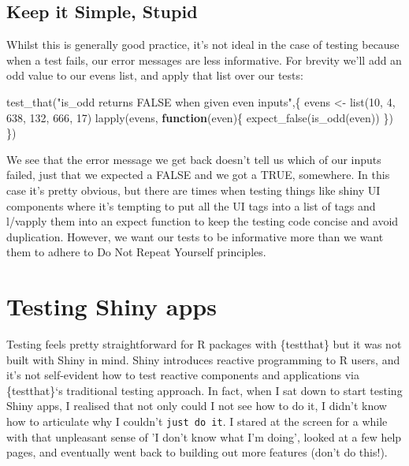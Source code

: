 \documentclass[
  letterpaper,
  DIV=11,
  numbers=noendperiod]{scrreprt}
\newenvironment{Shaded}{\begin{snugshade}}{\end{snugshade}}
\newcommand{\ControlFlowTok}[1]{\textcolor[rgb]{0.00,0.23,0.31}{\textbf{#1}}}
\newcommand{\DecValTok}[1]{\textcolor[rgb]{0.68,0.00,0.00}{#1}}
\newcommand{\FunctionTok}[1]{\textcolor[rgb]{0.28,0.35,0.67}{#1}}
\newcommand{\NormalTok}[1]{\textcolor[rgb]{0.00,0.23,0.31}{#1}}
\newcommand{\OtherTok}[1]{\textcolor[rgb]{0.00,0.23,0.31}{#1}}
\newcommand{\StringTok}[1]{\textcolor[rgb]{0.13,0.47,0.30}{#1}}
\begin{document}
\section{Keep it Simple, Stupid}\label{keep-it-simple-stupid}

Whilst this is generally good practice, it's not ideal in the case of
testing because when a test fails, our error messages are less
informative. For brevity we'll add an odd value to our evens list, and
apply that list over our tests:

\begin{Shaded}
\begin{Highlighting}[]
\FunctionTok{test\_that}\NormalTok{(}\StringTok{"is\_odd returns FALSE when given even inputs"}\NormalTok{,\{}
\NormalTok{  evens }\OtherTok{\textless{}{-}} \FunctionTok{list}\NormalTok{(}\DecValTok{10}\NormalTok{, }\DecValTok{4}\NormalTok{, }\DecValTok{638}\NormalTok{, }\DecValTok{132}\NormalTok{, }\DecValTok{666}\NormalTok{, }\DecValTok{17}\NormalTok{)}
  \FunctionTok{lapply}\NormalTok{(evens, }\ControlFlowTok{function}\NormalTok{(even)\{}
    \FunctionTok{expect\_false}\NormalTok{(}\FunctionTok{is\_odd}\NormalTok{(even))}
\NormalTok{  \})}
\NormalTok{\})}
\end{Highlighting}
\end{Shaded}

We see that the error message we get back doesn't tell us which of our
inputs failed, just that we expected a FALSE and we got a TRUE,
somewhere. In this case it's pretty obvious, but there are times when
testing things like shiny UI components where it's tempting to put all
the UI tags into a list of tags and l/vapply them into an expect
function to keep the testing code concise and avoid duplication.
However, we want our tests to be informative more than we want them to
adhere to Do Not Repeat Yourself principles.

\chapter{Testing Shiny apps}\label{testing-shiny-apps}

Testing feels pretty straightforward for R packages with \{testthat\}
but it was not built with Shiny in mind. Shiny introduces reactive
programming to R users, and it's not self-evident how to test reactive
components and applications via \{testthat\}`s traditional testing
approach. In fact, when I sat down to start testing Shiny apps, I
realised that not only could I not see how to do it, I didn't know how
to articulate why I couldn't \texttt{just\ do\ it}. I stared at the
screen for a while with that unpleasant sense of 'I don't know what I'm
doing', looked at a few help pages, and eventually went back to building
out more features (don't do this!).
\end{document}
